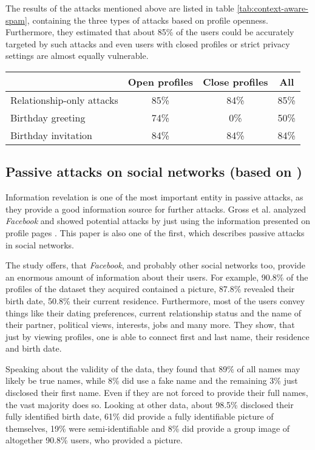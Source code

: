 The results of the attacks mentioned above are listed in table
\ref{tab:context-aware-spam}, containing the three types of attacks based on
profile openness. Furthermore, they estimated that about 85\% of the users
could be accurately targeted by such attacks and even users with closed
profiles or strict privacy settings are almost equally vulnerable.

\begin{table*}[ht]
  \centering
  \begin{tabular}{lccc}
    \toprule
    & Open profiles & Close profiles & All\\
    \midrule
    Relationship-only attacks & 85\% & 84\% & 85\% \\
    Birthday greeting         & 74\% &  0\% & 50\% \\
    Birthday invitation       & 84\% & 84\% & 84\% \\
    \bottomrule
  \end{tabular}
  \caption{Results of the case study of \cite{brown2008}}
  \label{tab:context-aware-spam}
\end{table*}

\subsection[Passive attacks on social networks]
{Passive attacks on social networks (based on \cite{gross2005})}

Information revelation is one of the most important entity in passive attacks,
as they provide a good information source for further attacks. Gross et al.
analyzed \textit{Facebook} and showed potential attacks by just using the
information presented on profile pages \cite{gross2005}. This paper is also one
of the first, which describes passive attacks in social networks.

The study offers, that \textit{Facebook}, and probably other social networks
too, provide an enormous amount of information about their users. For example,
90.8\% of the profiles of the dataset they acquired contained a picture, 87.8\%
revealed their birth date, 50.8\% their current residence. Furthermore, most of
the users convey things like their dating preferences, current relationship
status and the name of their partner, political views, interests, jobs and many
more. They show, that just by viewing profiles, one is able to connect first
and last name, their residence and birth date.

Speaking about the validity of the data, they found that 89\% of all names may
likely be true names, while 8\% did use a fake name and the remaining 3\% just
disclosed their first name. Even if they are not forced to provide their full
names, the vast majority does so. Looking at other data, about 98.5\% disclosed
their fully identified birth date, 61\% did provide a fully identifiable
picture of themselves, 19\% were semi-identifiable and 8\% did provide a group
image of altogether 90.8\% users, who provided a picture.


